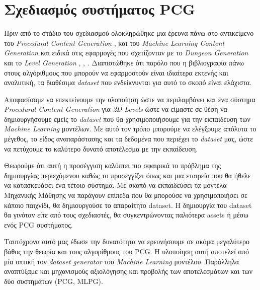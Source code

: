 \section{Σχεδιασμός συστήματος PCG}
Πριν από το στάδιο του σχεδιασμού ολοκληρώθηκε μια έρευνα πάνω στο αντικείμενο του \textit{Procedural Content Generation} \cite{answersetforpcg} \cite{constrainedsearchpcg} \cite{surrogate}, \cite{roguedream} και του  \textit{Machine Learning Content Generation \cite{mlpcg}} και ειδικά στις εφαρμογές που σχετίζονταν με το \textit{Dungeon Generation} και το \textit{Level Generation} \cite{cellular}, \cite{missions}, \cite{platform}. Διαπιστώθηκε ότι παρόλο που η βιβλιογραφία πάνω στους αλγόριθμους που μπορούν να εφαρμοστούν είναι ιδιαίτερα εκτενής και αναλυτική, τα διαθέσιμα \textit{dataset} που ενδείκνυνται για αυτό το σκοπό είναι ελάχιστα.
\par
Αποφασίσαμε να επεκτείνουμε την υλοποίηση ώστε να περιλαμβάνει και ένα σύστημα \textit{Procedural Content Generation} για \textit{2D Levels} ώστε να είμαστε σε θέση να δημιουργήσουμε εμείς το \textit{dataset} που θα χρησιμοποιήσουμε για την εκπαίδευση των \textit{Machine Learning} μοντέλων. Με αυτό τον τρόπο μπορούμε να ελέγξουμε απόλυτα το μέγεθος, το είδος αναπαράστασης και τα δεδομένα που περιέχει το \textit{dataset} μας, ώστε να πετύχουμε το καλύτερο δυνατό αποτέλεσμα με την εκπαίδευση.
\par
Θεωρούμε ότι αυτή η προσέγγιση καλύπτει πιο σφαιρικά το πρόβλημα της δημιουργίας περιεχόμενου καθώς το προσεγγίζει όπως και μια εταιρεία που θα ήθελε να κατασκευάσει ένα τέτοιο σύστημα. Με σκοπό να εκπαιδεύσει τα μοντέλα Μηχανικής Μάθησης να παράγουν επίπεδα που θα μπορούσε να χρησιμοποιήσει σε κάποιο παιχνίδι, θα δημιουργούσε το απαραίτητο dataset. Η δημιουργία του dataset θα γινόταν είτε από τους σχεδιαστές, θα συγκεντρώνοντας παλιότερα assets ή μέσω ενός PCG συστήματος.
\par
Ταυτόχρονα αυτό μας έδωσε την δυνατότητα να ερευνήσουμε σε ακόμα μεγαλύτερο βάθος την θεωρία και τους αλγορίθμους του PCG. Η υλοποίηση αυτή αποτελεί από μία οπτική τον \textit{dataset generator} του \textit{Machine Learning} μοντέλου. Παράλληλα αναπτύξαμε και μηχανισμούς αξιολόγησης και προβολής των αποτελεσμάτων και των δύο συστημάτων (PCG, MLPG).


